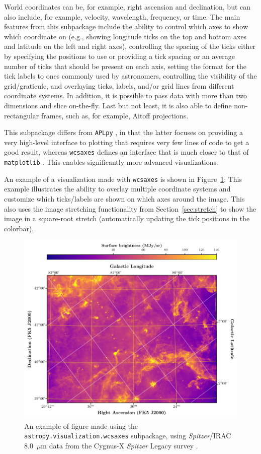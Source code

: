 \documentclass[modern]{aastex61}
\newcommand{\package}[1]{\texttt{#1}\xspace}
\newcommand{\sectionname}{Section\xspace}
\renewcommand{\figurename}{Figure\xspace}
\begin{document}
World coordinates can be, for example, right ascension and declination, but can
also include, for example, velocity, wavelength, frequency, or time.
The main features from this subpackage include the ability to control which
axes to show which coordinate on (e.g., showing longitude ticks on the
top and bottom axes and latitude on the left and right axes), controlling the
spacing of the ticks either by specifying the positions to use or providing a
tick spacing or an average number of ticks that should be present on each axis,
setting the format for the tick labels to ones commonly used by astronomers,
controlling the visibility of the grid/graticule, and overlaying ticks, labels,
and/or grid lines from different coordinate systems. In addition, it is
possible to pass data with more than two dimensions and slice on-the-fly.
Last but not least, it is also able to define non-rectangular frames, such as,
for example, Aitoff projections.

This subpackage differs from \package{APLpy} \citep{aplpy}, in that the latter
focuses on providing a very high-level interface to plotting that requires very
few lines of code to get a good result, whereas \package{wcsaxes} defines an
interface that is much closer to that of \package{matplotlib} \citep{matplotlib}.
This enables significantly more advanced visualizations.

An example of a visualization made with \package{wcsaxes} is shown in
\figurename~\ref{fig:wcsaxes}; This example illustrates the ability to
overlay multiple coordinate systems and customize which ticks/labels are shown
on which axes around the image. This also uses the image stretching
functionality from \sectionname~\ref{sec:stretch} to show the image in a
square-root stretch (automatically updating the tick positions in the colorbar).

\begin{figure}
\includegraphics[width=\textwidth]{cygnus_x_spitzer.pdf}
\caption{%
An example of figure made using the \package{astropy.visualization.wcsaxes}
subpackage, using \textit{Spitzer}/IRAC 8.0~$\mu$m data from the Cygnus-X
\textit{Spitzer} Legacy survey \citep{cygnusx}.
\label{fig:wcsaxes}
}
\end{figure}
\end{document}
